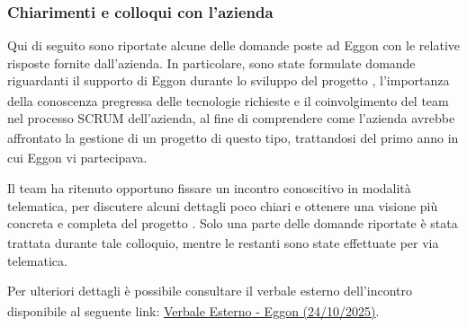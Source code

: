 \documentclass[a4paper,11pt]{article}
\begin{document}
\subsubsection{Chiarimenti e colloqui con l'azienda}

Qui di seguito sono riportate alcune delle domande poste ad Eggon con le relative risposte fornite dall'azienda. In particolare, sono state formulate domande riguardanti il supporto di Eggon durante lo sviluppo\textsubscript{}
 del progetto\textsubscript{}
, l'importanza della conoscenza pregressa delle tecnologie richieste e il coinvolgimento del team nel processo SCRUM\textsubscript{}
 dell'azienda, al fine di comprendere come l'azienda avrebbe affrontato la gestione di un progetto\textsubscript{}
 di questo tipo, trattandosi del primo anno in cui Eggon vi partecipava.

Il team ha ritenuto opportuno fissare un incontro conoscitivo in modalità telematica, per discutere alcuni dettagli poco chiari e ottenere una visione più concreta e completa del progetto\textsubscript{}
. Solo una parte delle domande riportate è stata trattata durante tale colloquio, mentre le restanti sono state effettuate per via telematica.

Per ulteriori dettagli è possibile consultare il verbale esterno\textsubscript{} dell'incontro disponibile al seguente link: \href{https://bugbustersunipd.github.io/DocumentazioneSWE/CANDIDATURA/VERBALI/Esterni/VE_2025-10-24%20%5BEggon%5D/VE_2025-10-24%5BEggon%5D.pdf}{Verbale Esterno\textsubscript{\scalebox{0.6}{\textbf{G}}} - Eggon (24/10/2025)}.
\end{document}
